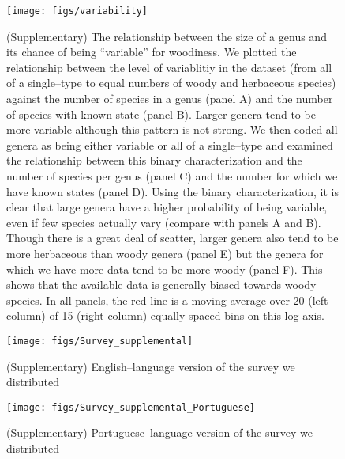 \documentclass[a4paper,12pt]{article}
\begin{document}
\begin{figure}[p]
  \centering
  \texttt{[image: figs/variability]}
  \caption{(Supplementary) The relationship between the size of a genus
and its chance of being ``variable'' for woodiness.
%
We plotted the relationship between the level of variablitiy in the
dataset (from all of a single--type to equal numbers of woody and
herbaceous species) against the number of species in a genus (panel A)
and the number of species with known state (panel B). Larger genera
tend to be more variable although this pattern is not strong. We then
coded all genera as being either variable or all of a single--type and
examined the relationship between this binary characterization and the
number of species per genus (panel C) and the number for which we
have known states (panel D). Using the binary characterization, it is
clear that large genera have a higher probability of being variable,
even if few species actually vary (compare with panels A and
B). Though there is a great deal of scatter, larger genera also tend to be
more herbaceous than woody genera (panel E) but the genera for which
we have more data tend to be more woody (panel F). This shows that the
available data is generally biased towards woody species.  In all
panels, the red line is a moving average over 20 (left column) of 15 (right
column) equally spaced bins on this log axis.}
  \label{fig:variability}
\end{figure}

\begin{figure}[p]
  \centering
  \vspace{-20ex}
  \texttt{[image: figs/Survey\_supplemental]}
  \caption{(Supplementary) English--language version of the survey we
    distributed}
  \label{fig:survey-text}
\end{figure}

\begin{figure}[p]
  \centering
  \vspace{-20ex}
  \texttt{[image: figs/Survey\_supplemental\_Portuguese]}
  \caption{(Supplementary) Portuguese--language version of the survey we
    distributed}
  \label{fig:survey-text-port}
\end{figure}
\end{document}
